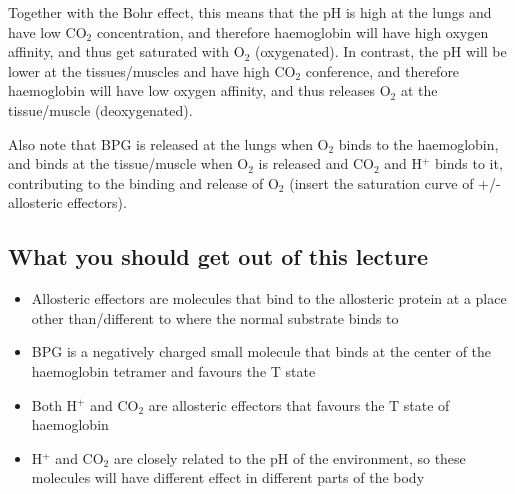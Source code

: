 Together with the Bohr effect, this means that the pH is high at the lungs and have low CO$_2$ concentration, and therefore haemoglobin will have high oxygen affinity, and thus get saturated with O$_2$ (oxygenated).
In contrast, the pH will be lower at the tissues/muscles and have high CO$_2$ conference, and therefore haemoglobin will have low oxygen affinity, and thus releases O$_2$ at the tissue/muscle (deoxygenated).

Also note that BPG is released at the lungs when O$_2$ binds to the haemoglobin, and binds at the tissue/muscle when O$_2$ is released and CO$_2$ and H$^+$ binds to it, contributing to the binding and release of O$_2$ (insert the saturation curve of +/- allosteric effectors).


\subsection*{What you should get out of this lecture}

\begin{itemize}
	\item Allosteric effectors are molecules that bind to the allosteric protein at a place other than/different to where the normal substrate binds to
	\item BPG is a negatively charged small molecule that binds at the center of the haemoglobin tetramer and favours the T state
	\item Both H$^+$ and CO$_2$ are allosteric effectors that favours the T state of haemoglobin
	\item H$^+$ and CO$_2$ are closely related to the pH of the environment, so these molecules will have different effect in different parts of the body
\end{itemize}
